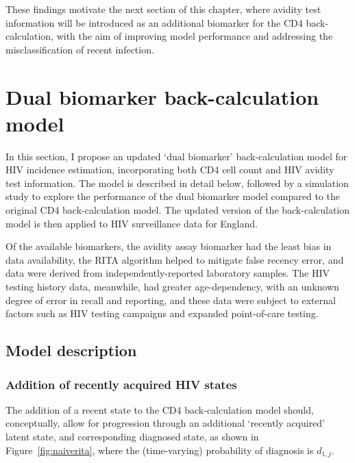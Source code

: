 These findings motivate the next section of this chapter, where avidity test information will be introduced as an additional biomarker for the CD4 back-calculation, with the aim of improving model performance and addressing the misclassification of recent infection.

\section{Dual biomarker back-calculation model}

In this section, I propose an updated `dual biomarker' back-calculation model for HIV incidence estimation, incorporating both CD4 cell count and HIV avidity test information. The model is described in detail below, followed by a simulation study to explore the performance of the dual biomarker model compared to the original CD4 back-calculation model. The updated version of the back-calculation model is then applied to HIV surveillance data for England.

Of the available biomarkers, the avidity assay biomarker had the least bias in data availability, the RITA algorithm helped to mitigate false recency error, and data were derived from independently-reported laboratory samples. The HIV testing history data, meanwhile, had greater age-dependency, with an unknown degree of error in recall and reporting, and these data were subject to external factors such as HIV testing campaigns and expanded point-of-care testing.

\subsection{Model description}\label{sec:dual-biomarker-model}

\subsubsection{Addition of recently acquired HIV states}

The addition of a recent state to the CD4 back-calculation model should, conceptually, allow for progression through an additional `recently acquired' latent state, and corresponding diagnosed state, as shown in Figure~\ref{fig:naiverita}, where the (time-varying) probability of diagnosis is $d_{1,j}$.

